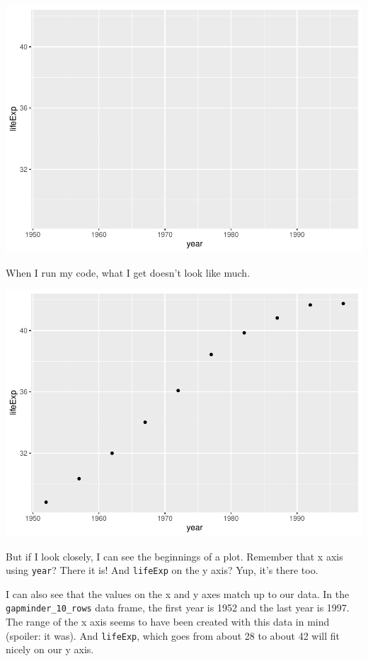 \documentclass[
]{book}
\begin{document}
\includegraphics[width=1\linewidth]{data-viz_files/figure-latex/unnamed-chunk-9-1}

When I run my code, what I get doesn't look like much.

\includegraphics[width=1\linewidth]{data-viz_files/figure-latex/unnamed-chunk-11-1}

But if I look closely, I can see the beginnings of a plot. Remember that x axis using \texttt{year}? There it is! And \texttt{lifeExp} on the y axis? Yup, it's there too.

I can also see that the values on the x and y axes match up to our data. In the \texttt{gapminder\_10\_rows} data frame, the first year is 1952 and the last year is 1997. The range of the x axis seems to have been created with this data in mind (spoiler: it was). And \texttt{lifeExp}, which goes from about 28 to about 42 will fit nicely on our y axis.
\end{document}
